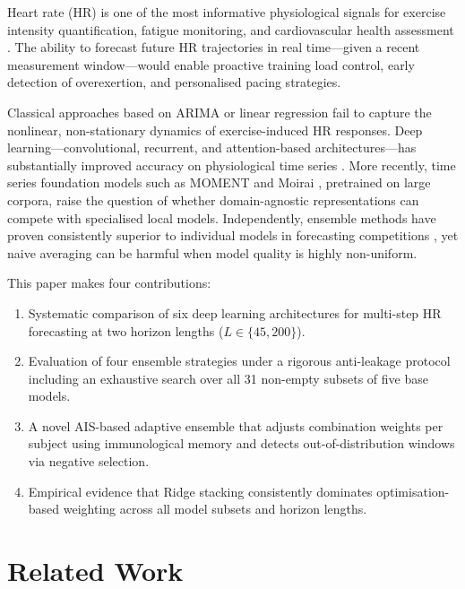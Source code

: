 \documentclass[conference]{IEEEtran}
\begin{document}
Heart rate (HR) is one of the most informative physiological signals for
exercise intensity quantification, fatigue monitoring, and cardiovascular health
assessment \cite{achten2003}. The ability to forecast future HR trajectories in
real time---given a recent measurement window---would enable proactive training
load control, early detection of overexertion, and personalised pacing
strategies.

Classical approaches based on ARIMA or linear regression \cite{box2015} fail
to capture the nonlinear, non-stationary dynamics of exercise-induced HR
responses. Deep learning---convolutional, recurrent, and attention-based
architectures---has substantially improved accuracy on physiological time
series \cite{nakamura2020}. More recently, time series foundation models
such as MOMENT \cite{goswami2024moment} and Moirai \cite{woo2024moirai}, pretrained
on large corpora, raise the question of whether domain-agnostic representations
can compete with specialised local models. Independently, ensemble methods
have proven consistently superior to individual models in forecasting
competitions \cite{makridakis2018m4}, yet naive averaging can be harmful when
model quality is highly non-uniform.

This paper makes four contributions:
\begin{enumerate}[leftmargin=*,noitemsep,topsep=2pt]
  \item Systematic comparison of six deep learning architectures for
        multi-step HR forecasting at two horizon lengths ($L \in \{45, 200\}$).
  \item Evaluation of four ensemble strategies under a rigorous anti-leakage
        protocol including an exhaustive search over all 31 non-empty subsets of
        five base models.
  \item A novel AIS-based adaptive ensemble that adjusts combination weights
        per subject using immunological memory and detects out-of-distribution
        windows via negative selection.
  \item Empirical evidence that Ridge stacking consistently dominates
        optimisation-based weighting across all model subsets and horizon lengths.
\end{enumerate}

\section{Related Work}
\label{sec:related}
\end{document}
